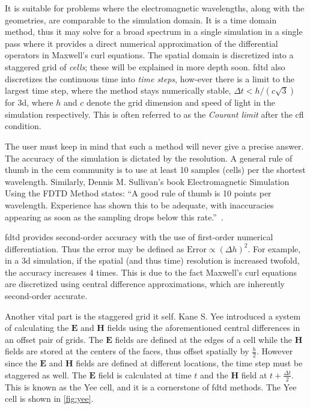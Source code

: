 It is suitable for problems where the electromagnetic wavelengths, along with the geometries, are comparable to the simulation domain. It is a time domain method, thus it may solve for a broad spectrum in a single simulation in a single pass where it provides a direct numerical approximation of the differential operators in Maxwell's curl equations. The spatial domain is discretized into a staggered grid of \emph{cells}; these will be explained in more depth soon. \gls{fdtd} also discretizes the continuous time into \emph{time steps}, how-ever there is a limit to the largest time step, where the method stays numerically stable, $\Delta t < h / \left( c \sqrt{3} \right)$ for \gls{3d}, where $h$ and $c$ denote the grid dimension and speed of light in the simulation respectively. This is often referred to as the \emph{Courant limit} after the \gls{cfl} condition.


The user must keep in mind that such a method will never give a precise answer. The accuracy of the simulation is dictated by the resolution. A general rule of thumb in the \gls{cem} community is to use at least 10 samples (cells) per the shortest wavelength. Similarly, Dennis M. Sullivan's book Electromagnetic Simulation Using the FDTD Method states: “A good rule of thumb is 10 points per wavelength. Experience has shown this to be adequate, with inaccuracies appearing as soon as the sampling drops below this rate.”~\cite[p.10]{sullivan2013fdtd}.


\gls{fdtd} provides second-order accuracy with the use of first-order numerical differentiation. Thus the error may be defined as $\text{Error} \propto (\Delta h)^2$. For example, in a \gls{3d} simulation, if the spatial (and thus time) resolution is increased twofold, the accuracy increases 4 times. This is due to the fact Maxwell’s curl equations are discretized using central difference approximations, which are inherently second-order accurate.


Another vital part is the staggered grid it self. Kane S. Yee introduced a system of calculating the $\mathbf{E}$ and $\mathbf{H}$ fields using the aforementioned central differences in an offset pair of grids. The $\mathbf{E}$ fields are defined at the edges of a cell while the $\mathbf{H}$ fields are stored at the centers of the faces, thus offset spatially by $\frac{h}{2}$.  However since the $\mathbf{E}$ and $\mathbf{H}$ fields are defined at different locations, the time step must be staggered as well. The $\mathbf{E}$ field is calculated at time $t$ and the $\mathbf{H}$ field at $t + \frac{\Delta t}{2}$. This is known as the Yee cell, and it is a cornerstone of \gls{fdtd} methods. The Yee cell is shown in \cref{fig:yee}.


